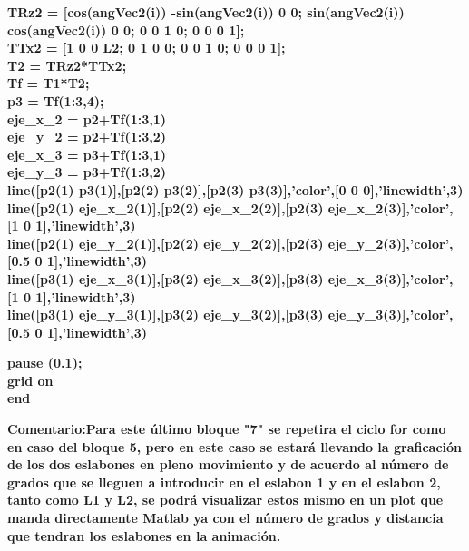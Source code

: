 \documentclass[10pt,a4paper]{article}
\begin{document}
\begin{flushleft}
\textbf{TRz2 = [cos(angVec2(i)) -sin(angVec2(i)) 0 0; sin(angVec2(i)) cos(angVec2(i)) 0 0; 0 0 1 0; 0 0 0 1];\\
TTx2 = [1 0 0 L2; 0 1 0 0; 0 0 1 0; 0 0 0 1];\\
T2 = TRz2*TTx2;\\
Tf = T1*T2;\\
p3 = Tf(1:3,4);\\
eje\_x\_2 = p2+Tf(1:3,1)\\
eje\_y\_2 = p2+Tf(1:3,2)\\
eje\_x\_3 = p3+Tf(1:3,1)\\
eje\_y\_3 = p3+Tf(1:3,2)\\
line([p2(1) p3(1)],[p2(2) p3(2)],[p2(3) p3(3)],'color',[0 0 0],'linewidth',3)\\
line([p2(1) eje\_x\_2(1)],[p2(2) eje\_x\_2(2)],[p2(3) eje\_x\_2(3)],'color',[1 0 1],'linewidth',3)\\
line([p2(1) eje\_y\_2(1)],[p2(2) eje\_y\_2(2)],[p2(3) eje\_y\_2(3)],'color',[0.5 0 1],'linewidth',3)\\
line([p3(1) eje\_x\_3(1)],[p3(2) eje\_x\_3(2)],[p3(3) eje\_x\_3(3)],'color',[1 0 1],'linewidth',3)\\
line([p3(1) eje\_y\_3(1)],[p3(2) eje\_y\_3(2)],[p3(3) eje\_y\_3(3)],'color',[0.5 0 1],'linewidth',3)\\
}
\end{flushleft}

\begin{flushleft}
\textbf{pause (0.1);\\ grid on\\
end}
\end{flushleft}

\begin{flushleft}
\textbf{Comentario:Para este último bloque "7" se repetira el ciclo for como en caso del bloque 5, pero en este caso se estará llevando la graficación de los dos eslabones en pleno movimiento y de acuerdo al número de grados que se lleguen a introducir en el eslabon 1 y en el eslabon 2, tanto como L1 y L2, se podrá visualizar estos mismo en un plot que manda directamente Matlab ya con el número de grados y distancia que tendran los eslabones en la animación.}
\end{flushleft}
\end{document}
